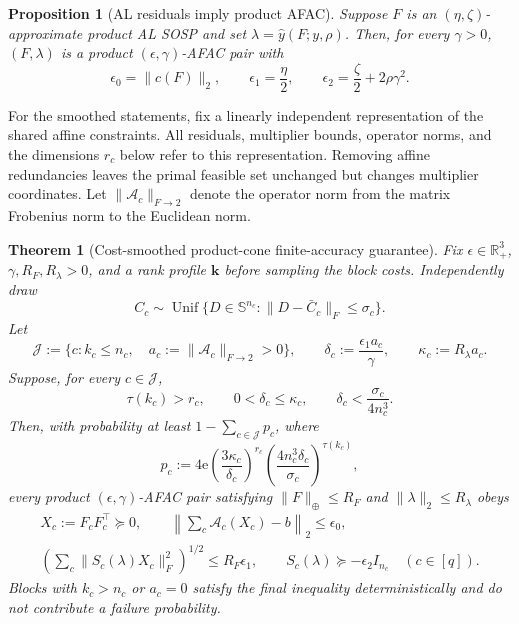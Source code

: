 \documentclass[11pt]{article}
\newtheorem{theorem}{Theorem}
\newtheorem{proposition}{Proposition}
\theoremstyle{definition}
\theoremstyle{remark}
\begin{document}
\begin{proposition}[AL residuals imply product AFAC]
\label{prop:alm-to-afac}
Suppose $F$ is an $(\eta,\zeta)$-approximate product AL SOSP and set
$\lambda=\widehat y(F;y,\rho)$.  Then, for every $\gamma>0$,
$(F,\lambda)$ is a product $(\epsilon,\gamma)$-AFAC pair with
\begin{equation}
  \epsilon_0=\|c(F)\|_2,
  \qquad
  \epsilon_1=\frac{\eta}{2},
  \qquad
  \epsilon_2=\frac{\zeta}{2}+2\rho\gamma^2.
  \label{eq:AL-to-AFAC-tolerances}
\end{equation}
\end{proposition}

For the smoothed statements, fix a linearly independent representation of
the shared affine constraints.  All residuals, multiplier bounds, operator
norms, and the dimensions $r_c$ below refer to this representation.  Removing
affine redundancies leaves the primal feasible set unchanged but changes
multiplier coordinates.  Let
$\|\mathcal A_c\|_{F\to2}$ denote the operator norm from the matrix
Frobenius norm to the Euclidean norm.

\begin{theorem}[Cost-smoothed product-cone finite-accuracy guarantee]
\label{thm:product-smoothed-low-rank}
Fix $\epsilon\in\mathbb R_+^3$, $\gamma,R_F,R_\lambda>0$, and a rank
profile $\mathbf k$ before sampling the block costs.  Independently draw
\[
  C_c\sim\operatorname{Unif}
  \{D\in\mathbb S^{n_c}:\|D-\bar C_c\|_F\leq\sigma_c\}.
\]
Let
\[
  \mathcal J:=\{c:k_c\leq n_c,\quad
                      a_c:=\|\mathcal A_c\|_{F\to2}>0\},
  \qquad
  \delta_c:=\frac{\epsilon_1a_c}{\gamma},
  \qquad
  \kappa_c:=R_\lambda a_c.
\]
Suppose, for every $c\in\mathcal J$,
\begin{equation}
  \tau(k_c)>r_c,
  \qquad
  0<\delta_c\leq\kappa_c,
  \qquad
  \delta_c<\frac{\sigma_c}{4n_c^3}.
  \label{eq:product-smoothed-basic-conditions}
\end{equation}
Then, with probability at least $1-\sum_{c\in\mathcal J}p_c$, where
\begin{equation}
  p_c
  :=4\mathrm e
    \left(\frac{3\kappa_c}{\delta_c}\right)^{r_c}
    \left(\frac{4n_c^3\delta_c}{\sigma_c}\right)^{\tau(k_c)},
  \label{eq:product-smoothed-failure}
\end{equation}
every product $(\epsilon,\gamma)$-AFAC pair satisfying
$\|F\|_\oplus\leq R_F$ and $\|\lambda\|_2\leq R_\lambda$ obeys
\begin{equation}
\begin{gathered}
  X_c:=F_cF_c^\top\succeq0,\qquad
  \left\|\sum_c\mathcal A_c(X_c)-b\right\|_2\leq\epsilon_0,\\
  \left(\sum_c\|S_c(\lambda)X_c\|_F^2\right)^{1/2}
    \leq R_F\epsilon_1,\qquad
  S_c(\lambda)\succeq-\epsilon_2I_{n_c}\quad(c\in[q]).
\end{gathered}
\label{eq:product-smoothed-kkt}
\end{equation}
Blocks with $k_c>n_c$ or $a_c=0$ satisfy the final inequality
deterministically and do not contribute a failure probability.
\end{theorem}
\end{document}

